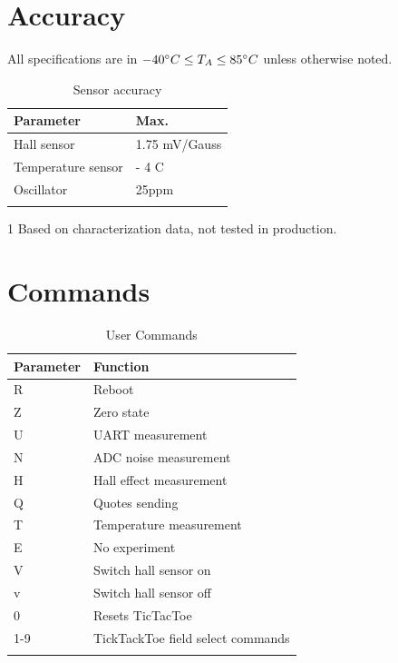 \documentclass[10pt]{datasheet}
\begin{document}
\section{Accuracy}
All specifications are in $-40\degree C \leq T_A \leq 85\degree C$ unless otherwise noted.
\begin{table}[h]
\caption{Sensor accuracy}
\begin{tabularx}{\textwidth}{l | X}
    \thickhline
	\textbf{Parameter} & \textbf{Max.}  \hspace{5cm} \\
    \hline
	Hall sensor & 1.75 mV/Gauss \\
	Temperature sensor & \pm 3 - 4 \degree C \\
	Oscillator & \pm 25ppm \\
	
    \thickhline
\end{tabularx}
	\begin{tablenotes}
\item[1]{Based on characterization data, not tested in production.}
	\end{tablenotes}
\end{table}





\newpage

\section{Commands}
\begin{table}[h]
\caption{User Commands}
\begin{tabularx}{\textwidth}{l | X}
    \thickhline
    \textbf{Parameter} & \textbf{Function} \hspace{5cm} \\
    \hline
   	R & Reboot \\
	Z & Zero state \\
	U & UART measurement\\
	N & ADC noise measurement\\
	H & Hall effect measurement\\
	Q & Quotes sending\\
	T & Temperature measurement\\
	E & No experiment\\
	V & Switch hall sensor on\\
	v & Switch hall sensor off\\
	0 & Resets TicTacToe\\
	1-9 & TickTackToe field select commands\\
    \thickhline
\end{tabularx}
\end{table}
\end{document}
